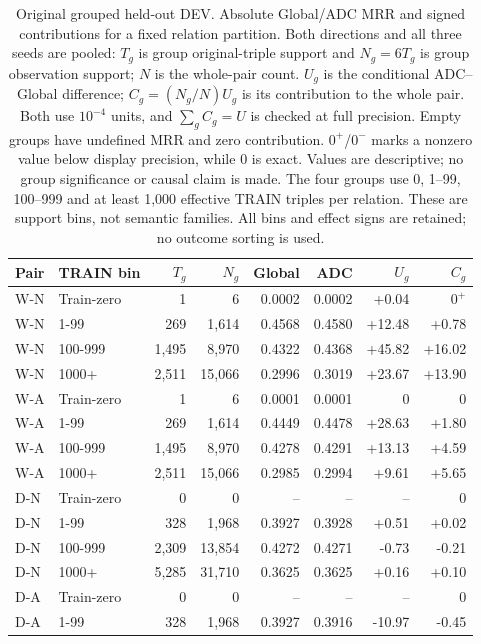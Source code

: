 \begin{table}[htbp]
\centering\footnotesize\setlength{\tabcolsep}{3pt}
\caption{Original grouped held-out DEV. Absolute Global/ADC MRR and signed contributions for a fixed relation partition. Both directions and all three seeds are pooled: $T_g$ is group original-triple support and $N_g=6T_g$ is group observation support; $N$ is the whole-pair count. $U_g$ is the conditional ADC--Global difference; $C_g=(N_g/N)U_g$ is its contribution to the whole pair. Both use $10^{-4}$ units, and $\sum_g C_g=U$ is checked at full precision. Empty groups have undefined MRR and zero contribution. $0^{+}$/$0^{-}$ marks a nonzero value below display precision, while 0 is exact. Values are descriptive; no group significance or causal claim is made. The four groups use 0, 1--99, 100--999 and at least 1,000 effective TRAIN triples per relation. These are support bins, not semantic families. All bins and effect signs are retained; no outcome sorting is used.}
\label{tab:group-frequency_dev_oof}
\begin{tabular}{llrrrrrr}
\toprule
Pair & TRAIN bin & $T_g$ & $N_g$ & Global & ADC & $U_g$ & $C_g$\\
\midrule
W-N & Train-zero & 1 & 6 & 0.0002 & 0.0002 & +0.04 & $0^{+}$\\
W-N & 1-99 & 269 & 1,614 & 0.4568 & 0.4580 & +12.48 & +0.78\\
W-N & 100-999 & 1,495 & 8,970 & 0.4322 & 0.4368 & +45.82 & +16.02\\
W-N & 1000+ & 2,511 & 15,066 & 0.2996 & 0.3019 & +23.67 & +13.90\\
W-A & Train-zero & 1 & 6 & 0.0001 & 0.0001 & 0 & 0\\
W-A & 1-99 & 269 & 1,614 & 0.4449 & 0.4478 & +28.63 & +1.80\\
W-A & 100-999 & 1,495 & 8,970 & 0.4278 & 0.4291 & +13.13 & +4.59\\
W-A & 1000+ & 2,511 & 15,066 & 0.2985 & 0.2994 & +9.61 & +5.65\\
D-N & Train-zero & 0 & 0 & -- & -- & -- & 0\\
D-N & 1-99 & 328 & 1,968 & 0.3927 & 0.3928 & +0.51 & +0.02\\
D-N & 100-999 & 2,309 & 13,854 & 0.4272 & 0.4271 & -0.73 & -0.21\\
D-N & 1000+ & 5,285 & 31,710 & 0.3625 & 0.3625 & +0.16 & +0.10\\
D-A & Train-zero & 0 & 0 & -- & -- & -- & 0\\
D-A & 1-99 & 328 & 1,968 & 0.3927 & 0.3916 & -10.97 & -0.45\\

\end{tabular}
\end{table}

